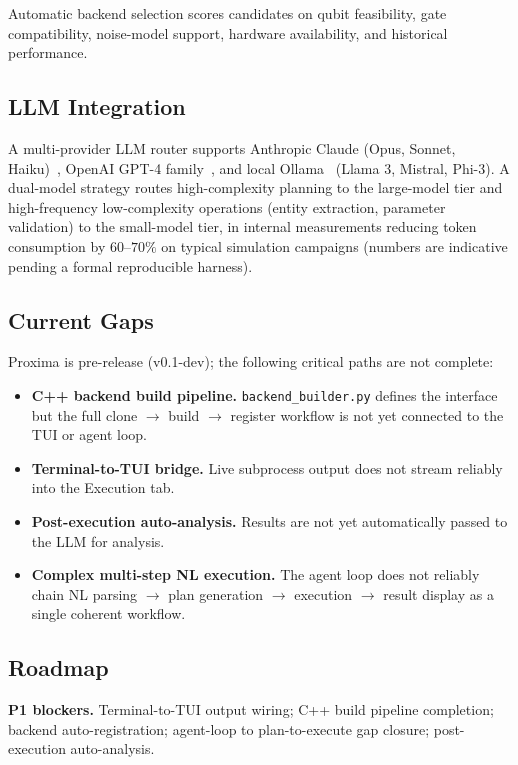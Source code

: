 \documentclass[11pt,a4paper]{article}
\begin{document}
Automatic backend selection scores candidates on qubit feasibility, gate
compatibility, noise-model support, hardware availability, and historical performance.

\subsection{LLM Integration}

A multi-provider LLM router supports Anthropic Claude (Opus, Sonnet,
Haiku)~\cite{anthropic_claude}, OpenAI GPT-4 family~\cite{openai_gpt4}, and local
Ollama~\cite{ollama} (Llama 3, Mistral, Phi-3). A dual-model strategy routes
high-complexity planning to the large-model tier and high-frequency low-complexity
operations (entity extraction, parameter validation) to the small-model tier, in
internal measurements reducing token consumption by $60$--$70\%$ on typical
simulation campaigns (numbers are indicative pending a formal reproducible harness).

\subsection{Current Gaps}

Proxima is pre-release (v0.1-dev); the following critical paths are not complete:

\begin{itemize}
  \item \textbf{C++ backend build pipeline.} \texttt{backend\_builder.py} defines the
        interface but the full clone $\to$ build $\to$ register workflow is not yet
        connected to the TUI or agent loop.
  \item \textbf{Terminal-to-TUI bridge.} Live subprocess output does not stream
        reliably into the Execution tab.
  \item \textbf{Post-execution auto-analysis.} Results are not yet automatically
        passed to the LLM for analysis.
  \item \textbf{Complex multi-step NL execution.} The agent loop does not reliably
        chain NL parsing $\to$ plan generation $\to$ execution $\to$ result display
        as a single coherent workflow.
\end{itemize}

\subsection{Roadmap}

\textbf{P1 blockers.} Terminal-to-TUI output wiring; C++ build pipeline completion;
backend auto-registration; agent-loop to plan-to-execute gap closure;
post-execution auto-analysis.
\end{document}
